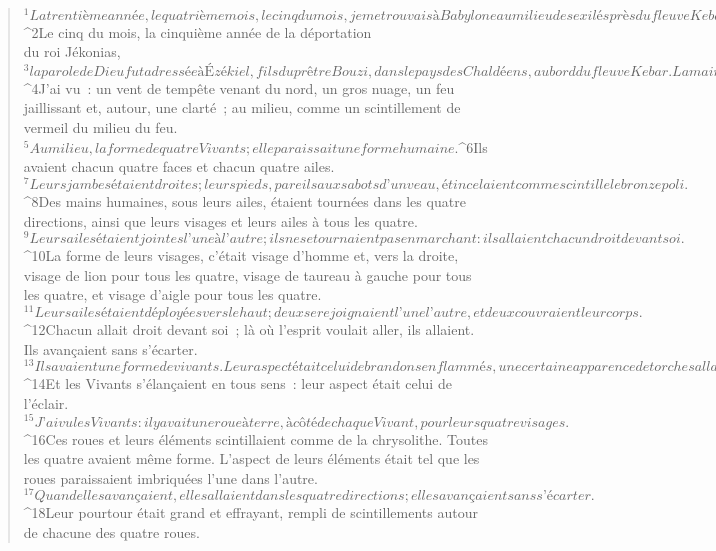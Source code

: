   
  
    
      
         
      \bchapter{}
      \begin{verse}
${}^{1}La trentième année, le quatrième mois, le cinq du mois, je me trouvais à Babylone au milieu des exilés près du fleuve Kebar ; les cieux s’ouvrirent et j’eus des visions divines.
${}^{2}Le cinq du mois, la cinquième année de la déportation\\du roi Jékonias, 
${}^{3} la parole de Dieu fut adressée à Ézékiel, fils du prêtre Bouzi, dans le pays des Chaldéens, au bord du fleuve Kebar. La main du Seigneur se posa sur lui.
${}^{4}J’ai vu : un vent de tempête venant du nord, un gros nuage, un feu jaillissant et, autour, une clarté ; au milieu, comme un scintillement de vermeil du milieu du feu. 
${}^{5}Au milieu, la forme de quatre Vivants ; elle paraissait une forme humaine. 
${}^{6}Ils avaient chacun quatre faces et chacun quatre ailes. 
${}^{7}Leurs jambes étaient droites ; leurs pieds, pareils aux sabots d’un veau, étincelaient comme scintille le bronze poli. 
${}^{8}Des mains humaines, sous leurs ailes, étaient tournées dans les quatre directions, ainsi que leurs visages et leurs ailes à tous les quatre. 
${}^{9}Leurs ailes étaient jointes l’une à l’autre ; ils ne se tournaient pas en marchant : ils allaient chacun droit devant soi. 
${}^{10}La forme de leurs visages, c’était visage d’homme et, vers la droite, visage de lion pour tous les quatre, visage de taureau à gauche pour tous les quatre, et visage d’aigle pour tous les quatre. 
${}^{11}Leurs ailes étaient déployées vers le haut ; deux se rejoignaient l’une l’autre, et deux couvraient leur corps. 
${}^{12}Chacun allait droit devant soi ; là où l’esprit voulait aller, ils allaient. Ils avançaient sans s’écarter. 
${}^{13}Ils avaient une forme de vivants. Leur aspect était celui de brandons enflammés, une certaine apparence de torches allait et venait entre les Vivants. Il y avait la clarté du feu, et des éclairs sortant du feu. 
${}^{14}Et les Vivants s’élançaient en tous sens : leur aspect était celui de l’éclair.
${}^{15}J’ai vu les Vivants : il y avait une roue à terre, à côté de chaque Vivant, pour leurs quatre visages. 
${}^{16}Ces roues et leurs éléments scintillaient comme de la chrysolithe. Toutes les quatre avaient même forme. L’aspect de leurs éléments était tel que les roues paraissaient imbriquées l’une dans l’autre. 
${}^{17}Quand elles avançaient, elles allaient dans les quatre directions ; elles avançaient sans s’écarter. 
${}^{18}Leur pourtour était grand et effrayant, rempli de scintillements autour de chacune des quatre roues. 

\end{verse}

